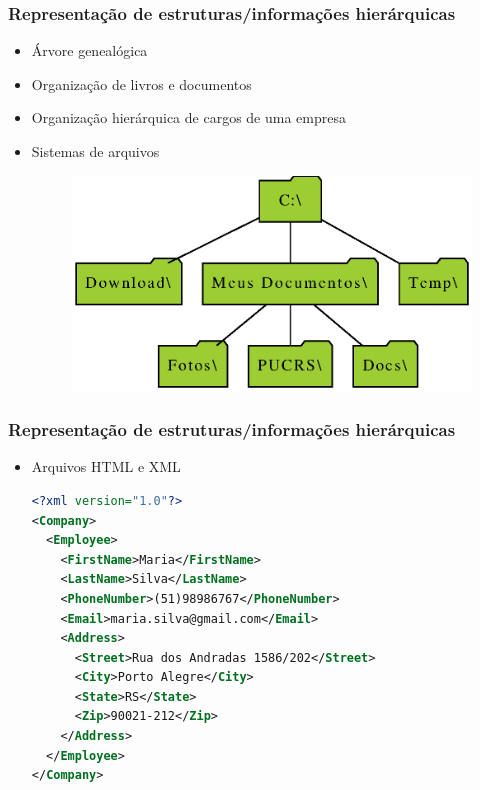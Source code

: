 \documentclass[aspectratio=169]{beamer}
\begin{document}
\begin{frame}\frametitle{Representação de estruturas/informações hierárquicas}
\begin{itemize}
	\item Árvore genealógica
	\item Organização de livros e documentos
	\item Organização hierárquica de cargos de uma empresa
	\item Sistemas de arquivos
\begin{figure}[h]
	\centering
	\includegraphics[height=0.4\paperheight]{imagens/arvore_de_diretorios.eps}
\end{figure}
\end{itemize}
\end{frame}

\begin{frame}[fragile]\frametitle{Representação de estruturas/informações hierárquicas}
\begin{itemize}
	\item Arquivos HTML e  XML
\begin{lstlisting}[language=XML,basicstyle=\ttfamily\scriptsize]
<?xml version="1.0"?>
<Company>
  <Employee>
    <FirstName>Maria</FirstName>
    <LastName>Silva</LastName>
    <PhoneNumber>(51)98986767</PhoneNumber>
    <Email>maria.silva@gmail.com</Email>
    <Address>
      <Street>Rua dos Andradas 1586/202</Street>
      <City>Porto Alegre</City>
      <State>RS</State>
      <Zip>90021-212</Zip>
    </Address>
  </Employee>
</Company>
\end{lstlisting}
\end{itemize}
\end{frame}
\end{document}
